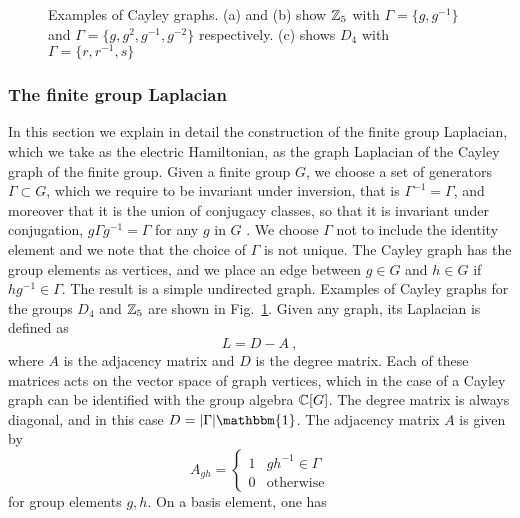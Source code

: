 \begin{figure}[t]
    \centering
    
    \caption[Examples of Cayley graphs]{%
        Examples of Cayley graphs.
        (a) and (b) show $\mathbb{Z}_5$ with $\Gamma = \{g,g^{-1}\}$ and $\Gamma = \{g,g^2, g^{-1}, g^{-2}\}$ respectively.
        (c) shows $D_4$ with $\Gamma = \{r,r^{-1}, s\}$
    }
    \label{fig:examples of Cayley graphs}
\end{figure}



\subsubsection{The finite group Laplacian}\label{sec:finitegrouplaplacian}
In this section we explain in detail the construction of the finite group Laplacian, which we take as the electric Hamiltonian, as the graph Laplacian of the Cayley graph of the finite group.
Given a finite group $G$, we choose a set of generators $\Gamma \subset G$, which we require to be invariant under inversion, that is $\Gamma^{-1}=\Gamma$, and moreover that it is the union of conjugacy classes, so that it is invariant under conjugation, $g \Gamma g^{-1}=\Gamma$ for any $g$ in $G$ \cite{spectralgraphtheory}.
We choose $\Gamma$ not to include the identity element and we note that the choice of $\Gamma$ is not unique.
The Cayley graph has the group elements as vertices, and we place an edge between $g \in G$ and $h \in G$ if $h g^{-1} \in \Gamma$.
The result is a simple undirected graph.
Examples of Cayley graphs for the groups $D_4$ and $\mathbb{Z}_5$ are shown in Fig.~\ref{fig:examples of Cayley graphs}.
Given any graph, its Laplacian is defined as \cite{spectralgraphtheory}
\begin{equation}
    L = D-A \ ,
\end{equation}
where $A$ is the adjacency matrix and $D$ is the degree matrix.
Each of these matrices acts on the vector space of graph vertices, which in the case of a Cayley graph can be identified with the group algebra $\mathbb{C}[G]$.
The degree matrix is always diagonal, and in this case $D=\abs{\Gamma} \mathbbm{1}$.
The adjacency matrix $A$ is given by
\begin{equation}
    A_{gh} = \begin{cases}1 & g h^{-1} \in \Gamma\\ 0 & \mathrm{otherwise}\end{cases}
\end{equation}
for group elements $g,h$.
On a basis element, one has

